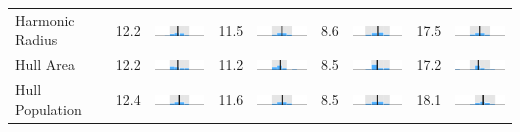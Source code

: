 \begin{table}
\begin{tabular}{l rm{7em} rm{7em} rm{7em} rm{7em}}
Harmonic Radius        &  12.2 &  \includegraphics[width=7em]{mini_hist/TX_senate_2008_harm_radius} &  11.5 &  \includegraphics[width=7em]{mini_hist/TX_senate_2012_harm_radius} &   8.6 &  \includegraphics[width=7em]{mini_hist/TX_senate_2014_harm_radius} &  17.5 &  \includegraphics[width=7em]{mini_hist/TX_senate_2018_harm_radius} \\
Hull Area              &  12.2 &       \includegraphics[width=7em]{mini_hist/TX_senate_2008_hull_a} &  11.2 &       \includegraphics[width=7em]{mini_hist/TX_senate_2012_hull_a} &   8.5 &       \includegraphics[width=7em]{mini_hist/TX_senate_2014_hull_a} &  17.2 &       \includegraphics[width=7em]{mini_hist/TX_senate_2018_hull_a} \\
Hull Population        &  12.4 &       \includegraphics[width=7em]{mini_hist/TX_senate_2008_hull_p} &  11.6 &       \includegraphics[width=7em]{mini_hist/TX_senate_2012_hull_p} &   8.5 &       \includegraphics[width=7em]{mini_hist/TX_senate_2014_hull_p} &  18.1 &       \includegraphics[width=7em]{mini_hist/TX_senate_2018_hull_p} \\

\end{tabular}
\end{table}
